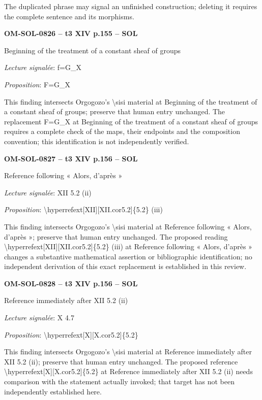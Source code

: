 The duplicated phrase may signal an unfinished construction; deleting it requires the complete sentence and its morphisms.\par
\par\noindent\textbf{OM-SOL-0826 -- t3 XIV p.155 -- SOL}\par
Beginning of the treatment of a constant sheaf of groups\par
\emph{Lecture signalée}: f=\allowbreak G\_X\par
\emph{Proposition}: F=\allowbreak G\_X\par
This finding intersects Orgogozo's \textbackslash{}sisi material at Beginning of the treatment of a constant sheaf of groups; preserve that human entry unchanged. The replacement F=\allowbreak G\_X at Beginning of the treatment of a constant sheaf of groups requires a complete check of the maps, their endpoints and the composition convention; this identification is not independently verified.\par
\par\noindent\textbf{OM-SOL-0827 -- t3 XIV p.156 -- SOL}\par
Reference following « Alors, d'après »\par
\emph{Lecture signalée}: XII 5.2 (ii)\par
\emph{Proposition}: \textbackslash{}hyperrefext[XII][XII.cor5.2]\{5.2\} (iii)\par
This finding intersects Orgogozo's \textbackslash{}sisi material at Reference following « Alors, d'après »; preserve that human entry unchanged. The proposed reading \textbackslash{}hyperrefext[XII][XII.cor5.2]\{5.2\} (iii) at Reference following « Alors, d'après » changes a substantive mathematical assertion or bibliographic identification; no independent derivation of this exact replacement is established in this review.\par
\par\noindent\textbf{OM-SOL-0828 -- t3 XIV p.156 -- SOL}\par
Reference immediately after XII 5.2 (ii)\par
\emph{Lecture signalée}: X 4.7\par
\emph{Proposition}: \textbackslash{}hyperrefext[X][X.cor5.2]\{5.2\}\par
This finding intersects Orgogozo's \textbackslash{}sisi material at Reference immediately after XII 5.2 (ii); preserve that human entry unchanged. The proposed reference \textbackslash{}hyperrefext[X][X.cor5.2]\{5.2\} at Reference immediately after XII 5.2 (ii) needs comparison with the statement actually invoked; that target has not been independently established here.\par

